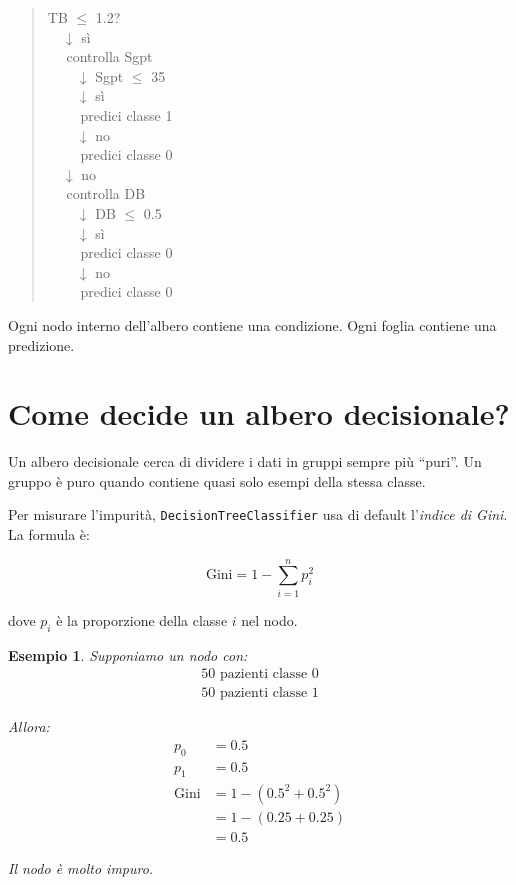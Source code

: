 \documentclass[11pt,a4paper]{article}
\newtheorem{example}{Esempio}
\begin{document}
\begin{quote}
    TB $\leq$ 1.2? \\
    $\quad \downarrow$ sì \\
    $\quad$ controlla Sgpt \\
    $\quad \quad \downarrow$ Sgpt $\leq$ 35 \\
    $\quad \quad \downarrow$ sì \\
    $\quad \quad$ predici classe 1 \\
    $\quad \quad \downarrow$ no \\
    $\quad \quad$ predici classe 0 \\
    $\quad \downarrow$ no \\
    $\quad$ controlla DB \\
    $\quad \quad \downarrow$ DB $\leq$ 0.5 \\
    $\quad \quad \downarrow$ sì \\
    $\quad \quad$ predici classe 0 \\
    $\quad \quad \downarrow$ no \\
    $\quad \quad$ predici classe 0
\end{quote}

Ogni nodo interno dell'albero contiene una condizione. Ogni foglia contiene una predizione.

\section{Come decide un albero decisionale?}
Un albero decisionale cerca di dividere i dati in gruppi sempre più ``puri''. Un gruppo è puro quando contiene quasi solo esempi della stessa classe.

Per misurare l'impurità, \texttt{DecisionTreeClassifier} usa di default l'\textit{indice di Gini}. La formula è:

\begin{equation}
    \text{Gini} = 1 - \sum_{i=1}^{n} p_i^2
\end{equation}

dove $p_i$ è la proporzione della classe $i$ nel nodo.

\begin{example}
Supponiamo un nodo con:
\begin{align*}
    50 \text{ pazienti classe } 0 \\
    50 \text{ pazienti classe } 1
\end{align*}

Allora:
\begin{align*}
    p_0 &= 0.5 \\
    p_1 &= 0.5 \\
    \text{Gini} &= 1 - (0.5^2 + 0.5^2) \\
               &= 1 - (0.25 + 0.25) \\
               &= 0.5
\end{align*}

Il nodo è molto impuro.
\end{example}
\end{document}
